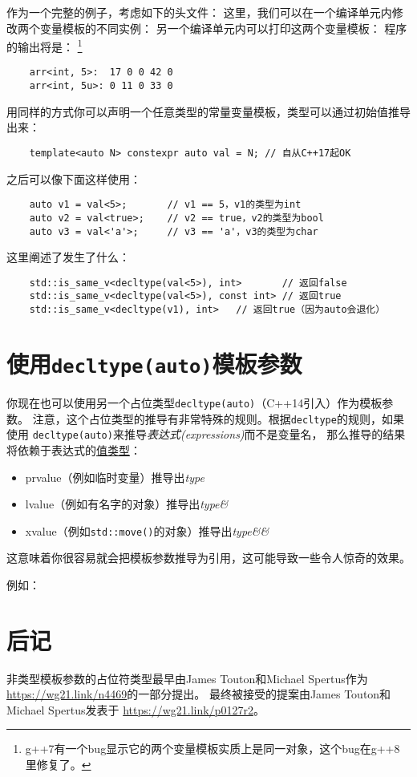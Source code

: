 作为一个完整的例子，考虑如下的头文件：
这里，我们可以在一个编译单元内修改两个变量模板的不同实例：
另一个编译单元内可以打印这两个变量模板：
程序的输出将是：
\footnote{g++7有一个bug显示它的两个变量模板实质上是同一对象，这个bug在g++8里修复了。}
\begin{lstlisting}
    arr<int, 5>:  17 0 0 42 0
    arr<int, 5u>: 0 11 0 33 0
\end{lstlisting}
用同样的方式你可以声明一个任意类型的常量变量模板，类型可以通过初始值推导出来：
\begin{lstlisting}
    template<auto N> constexpr auto val = N; // 自从C++17起OK
\end{lstlisting}
之后可以像下面这样使用：
\begin{lstlisting}
    auto v1 = val<5>;       // v1 == 5，v1的类型为int
    auto v2 = val<true>;    // v2 == true，v2的类型为bool
    auto v3 = val<'a'>;     // v3 == 'a'，v3的类型为char
\end{lstlisting}
这里阐述了发生了什么：
\begin{lstlisting}
    std::is_same_v<decltype(val<5>), int>       // 返回false
    std::is_same_v<decltype(val<5>), const int> // 返回true
    std::is_same_v<decltype(v1), int>   // 返回true（因为auto会退化）
\end{lstlisting}

\section{使用\texttt{decltype(auto)}模板参数}
你现在也可以使用另一个占位类型\texttt{decltype(auto)}（C++14引入）作为模板参数。
注意，这个占位类型的推导有非常特殊的规则。根据\texttt{decltype}的规则，如果使用
\texttt{decltype(auto)}来推导\emph{表达式(expressions)}而不是变量名，
那么推导的结果将依赖于表达式的\hyperref[ch5.3.1]{值类型}：
\begin{itemize}
    \item prvalue（例如临时变量）推导出\emph{type}
    \item lvalue（例如有名字的对象）推导出\emph{type\&}
    \item xvalue（例如\texttt{std::move()}的对象）推导出\emph{type\&\&}
\end{itemize}
这意味着你很容易就会把模板参数推导为引用，这可能导致一些令人惊奇的效果。

例如：

\section{后记}
非类型模板参数的占位符类型最早由James Touton和Michael Spertus作为
\url{https://wg21.link/n4469}的一部分提出。
最终被接受的提案由James Touton和Michael Spertus发表于
\url{https://wg21.link/p0127r2}。